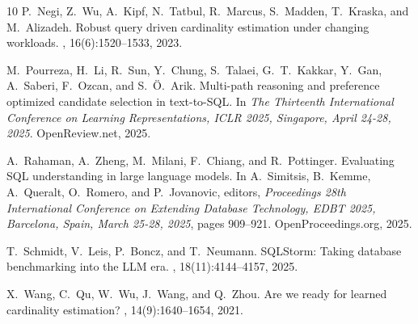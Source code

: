 \documentclass[a4paper]{report}
\begin{document}
\begin{thebibliography}{10}
P.~Negi, Z.~Wu, A.~Kipf, N.~Tatbul, R.~Marcus, S.~Madden, T.~Kraska, and
  M.~Alizadeh.
\newblock Robust query driven cardinality estimation under changing workloads.
, 16(6):1520--1533, 2023.

M.~Pourreza, H.~Li, R.~Sun, Y.~Chung, S.~Talaei, G.~T.~Kakkar, Y.~Gan,
  A.~Saberi, F.~Ozcan, and S.~{\"{O}}.~Arik.
 Multi-path reasoning and preference optimized candidate
  selection in text-to-SQL.
\newblock In {\em The Thirteenth International Conference on Learning
  Representations, {ICLR} 2025, Singapore, April 24-28, 2025}. OpenReview.net,
  2025.

A.~Rahaman, A.~Zheng, M.~Milani, F.~Chiang, and R.~Pottinger.
\newblock Evaluating {SQL} understanding in large language models.
\newblock In A.~Simitsis, B.~Kemme, A.~Queralt, O.~Romero, and P.~Jovanovic,
  editors, {\em Proceedings 28th International Conference on Extending Database
  Technology, {EDBT} 2025, Barcelona, Spain, March 25-28, 2025}, pages
  909--921. OpenProceedings.org, 2025.

T.~Schmidt, V.~Leis, P.~Boncz, and T.~Neumann.
\newblock SQLStorm: Taking database benchmarking into the {LLM} era.
, 18(11):4144--4157, 2025.

X.~Wang, C.~Qu, W.~Wu, J.~Wang, and Q.~Zhou.
\newblock Are we ready for learned cardinality estimation?
, 14(9):1640--1654, 2021.

\end{thebibliography}
\end{document}
